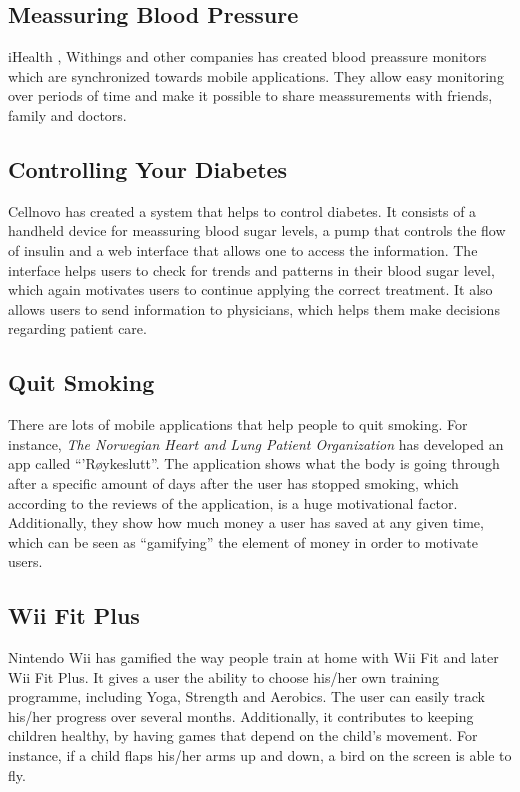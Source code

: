 \subsection{Meassuring Blood Pressure}
iHealth , Withings and other companies has created blood preassure monitors which are synchronized towards mobile applications. They allow easy monitoring over periods of time and make it possible to share meassurements with friends, family and doctors.


\subsection{Controlling Your Diabetes}
Cellnovo has created a system that helps to control diabetes. It consists of a handheld device for meassuring blood sugar levels, a pump that controls the flow of insulin and a web interface that allows one to access the information. The interface helps users to check for trends and patterns in their blood sugar level, which again motivates users to continue applying the correct treatment. It also allows users to send information to physicians, which helps them make decisions regarding patient care.
      


\subsection{Quit Smoking}
There are lots of mobile applications that help people to quit smoking. For instance, \emph{The Norwegian Heart and Lung Patient Organization} has developed an app called ``'R\o ykeslutt''. The application shows what the body is going through after a specific amount of days after the user has stopped smoking, which according to the reviews of the application, is a huge motivational factor. Additionally, they show how much money a user has saved at any given time, which can be seen as ``gamifying'' the element of money in order to motivate users.  


\subsection{Wii Fit Plus}
Nintendo Wii has gamified the way people train at home with Wii Fit and later Wii Fit Plus. It gives a user the ability to choose his/her own training programme, including Yoga, Strength and Aerobics. The user can easily track his/her progress over several months. Additionally, it contributes to keeping children healthy, by having games that depend on the child's movement. For instance, if a child flaps his/her arms up and down, a bird on the screen is able to fly.    
 